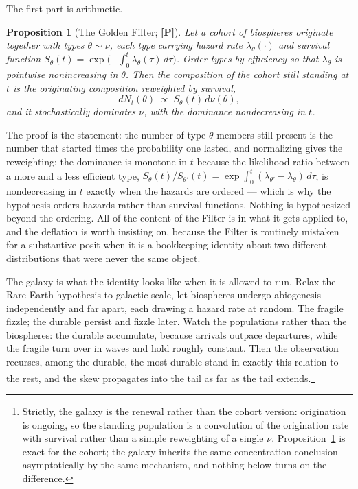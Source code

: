 \documentclass[11pt]{article}
\numberwithin{equation}{section}
\theoremstyle{plain}
\newtheorem{proposition}[theorem]{Proposition}
\theoremstyle{definition}
\theoremstyle{remark}
\begin{document}
The first part is arithmetic.

\begin{proposition}[The Golden Filter; \textbf{[P]}]\label{ac:prop:filter}
Let a cohort of biospheres originate together with types $\theta \sim \nu$, each type carrying hazard rate $\lambda_\theta(\cdot)$ and survival function $S_\theta(t) = \exp\!\big({-\int_0^t \lambda_\theta(\tau)\,d\tau}\big)$. Order types by efficiency so that $\lambda_\theta$ is pointwise nonincreasing in $\theta$. Then the composition of the cohort still standing at $t$ is the originating composition reweighted by survival,
\[
    dN_t(\theta) \;\propto\; S_\theta(t) \, d\nu(\theta),
\]
and it stochastically dominates $\nu$, with the dominance nondecreasing in $t$.
\end{proposition}

The proof is the statement: the number of type-$\theta$ members still present is the number that started times the probability one lasted, and normalizing gives the reweighting; the dominance is monotone in $t$ because the likelihood ratio between a more and a less efficient type, $S_\theta(t)/S_{\theta'}(t) = \exp\!\int_0^t (\lambda_{\theta'} - \lambda_\theta)\,d\tau$, is nondecreasing in $t$ exactly when the hazards are ordered --- which is why the hypothesis orders hazards rather than survival functions. Nothing is hypothesized beyond the ordering. All of the content of the Filter is in what it gets applied to, and the deflation is worth insisting on, because the Filter is routinely mistaken for a substantive posit when it is a bookkeeping identity about two different distributions that were never the same object.

The galaxy is what the identity looks like when it is allowed to run. Relax the Rare-Earth hypothesis to galactic scale, let biospheres undergo abiogenesis independently and far apart, each drawing a hazard rate at random. The fragile fizzle; the durable persist and fizzle later. Watch the populations rather than the biospheres: the durable accumulate, because arrivals outpace departures, while the fragile turn over in waves and hold roughly constant. Then the observation recurses, among the durable, the most durable stand in exactly this relation to the rest, and the skew propagates into the tail as far as the tail extends.\footnote{Strictly, the galaxy is the renewal rather than the cohort version: origination is ongoing, so the standing population is a convolution of the origination rate with survival rather than a simple reweighting of a single $\nu$. Proposition~\ref{ac:prop:filter} is exact for the cohort; the galaxy inherits the same concentration conclusion asymptotically by the same mechanism, and nothing below turns on the difference.}
\end{document}
